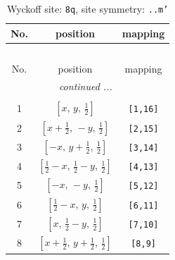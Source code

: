 \documentclass[fleqn,8pt]{jsarticle}
\begin{document}
\begin{longtable}{ccc}
\caption{Wyckoff site: {\tt 8q}, site symmetry: {\tt ..m'}}
 \\
 \hline \hline
No. & position & mapping \\ \hline \endfirsthead

\multicolumn{2}{l}{\tablename\ \thetable{}} \\
 \hline \hline
No. & position & mapping \\ \hline \endhead

 \hline \hline
\multicolumn{2}{r}{\footnotesize\it continued ...} \\ \endfoot

 \hline \hline
\multicolumn{2}{r}{} \\ \endlastfoot

1 & $\left[ x,\, y,\, \frac{1}{2} \right]$ & {\tt [1,16]} \\ \hline
2 & $\left[ x + \frac{1}{2},\, - y,\, \frac{1}{2} \right]$ & {\tt [2,15]} \\ \hline
3 & $\left[ - x,\, y + \frac{1}{2},\, \frac{1}{2} \right]$ & {\tt [3,14]} \\ \hline
4 & $\left[ \frac{1}{2} - x,\, \frac{1}{2} - y,\, \frac{1}{2} \right]$ & {\tt [4,13]} \\ \hline
5 & $\left[ - x,\, - y,\, \frac{1}{2} \right]$ & {\tt [5,12]} \\ \hline
6 & $\left[ \frac{1}{2} - x,\, y,\, \frac{1}{2} \right]$ & {\tt [6,11]} \\ \hline
7 & $\left[ x,\, \frac{1}{2} - y,\, \frac{1}{2} \right]$ & {\tt [7,10]} \\ \hline
8 & $\left[ x + \frac{1}{2},\, y + \frac{1}{2},\, \frac{1}{2} \right]$ & {\tt [8,9]} \\
\end{longtable}
\renewcommand{\arraystretch}{1.2}
\end{document}
